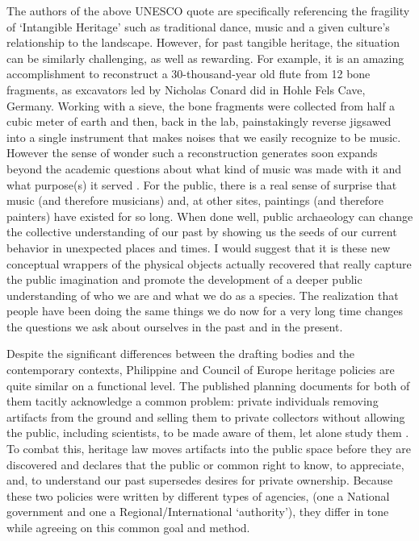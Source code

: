 The authors of the above UNESCO quote are specifically referencing the fragility of ‘Intangible Heritage’ such as traditional dance, music and a given culture’s relationship to the landscape. However, for past tangible heritage, the situation can be similarly challenging, as well as rewarding. For example, it is an amazing accomplishment to reconstruct a 30-thousand-year old flute from 12 bone fragments, as excavators led by Nicholas Conard did in Hohle Fels Cave, Germany. Working with a sieve, the bone fragments were collected from half a cubic meter of earth and then, back in the lab, painstakingly reverse jigsawed into a single instrument that makes noises that we easily recognize to be music.  However the sense of wonder such a reconstruction generates soon expands beyond the academic questions about what kind of music was made with it and what purpose(s) it served \parencite{Conard_2009}. 
For the public, there is a real sense of surprise that music (and therefore musicians) and, at other sites, paintings (and therefore painters) have existed for so long. When done well, public archaeology can change the collective understanding of our past by showing us the seeds of our current behavior in unexpected places and times. I would suggest that it is these new conceptual wrappers of the physical objects actually recovered that really capture the public imagination and promote the development of a deeper public understanding of who we are and what we do as a species. The realization that people have been doing the same things we do now for a very long time changes the questions we ask about ourselves in the past and in the present. 


Despite the significant differences between the drafting bodies and the contemporary contexts, Philippine and Council of Europe heritage policies are quite similar on a functional level. The published planning documents for both of them tacitly acknowledge a common problem: private individuals removing artifacts from the ground and selling them to private collectors without allowing the public, including scientists, to be made aware of them, let alone study them \parencites[2]{Valletta_1992}[18-20]{RA10066}. To combat this, heritage law moves artifacts into the public space before they are discovered and declares that the public or common right to know, to appreciate, and, to understand our past supersedes desires for private ownership. Because these two policies were written by different types of agencies, (one a National government and one a Regional/International ‘authority’), they differ in tone while agreeing on this common goal and method. 

